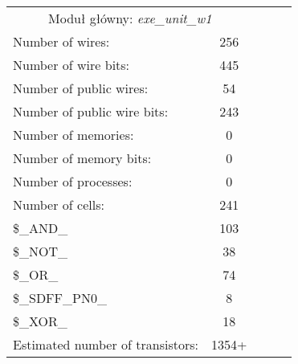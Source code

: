 \begin{table}[h!]
	\centering
	\begin{tabular}{lllll}
		\cline{1-2}
		\multicolumn{2}{|c|}{Moduł główny: \emph{exe\_unit\_w1}} &  &  &  \\ \cline{1-2}
		\multicolumn{1}{|l|}{Number of wires:} & \multicolumn{1}{c|}{256} &  &  &  \\ \cline{1-2}
		\multicolumn{1}{|l|}{Number of wire bits:} & \multicolumn{1}{c|}{445} &  &  &  \\ \cline{1-2}
		\multicolumn{1}{|l|}{Number of public wires:} & \multicolumn{1}{c|}{54} &  &  &  \\ \cline{1-2}
		\multicolumn{1}{|l|}{Number of public wire bits:} & \multicolumn{1}{c|}{243} &  &  &  \\ \cline{1-2}
		\multicolumn{1}{|l|}{Number of memories:} & \multicolumn{1}{c|}{0} &  &  &  \\ \cline{1-2}
		\multicolumn{1}{|l|}{Number of memory bits: } & \multicolumn{1}{c|}{0} &  &  &  \\ \cline{1-2}
		\multicolumn{1}{|l|}{Number of processes: } & \multicolumn{1}{c|}{0} &  &  &  \\ \cline{1-2}
		\multicolumn{1}{|l|}{Number of cells:} & \multicolumn{1}{c|}{241} &  &  &  \\ \cline{1-2}
		\multicolumn{1}{|l|}{\$\_AND\_} & \multicolumn{1}{c|}{103} &  &  &  \\ \cline{1-2}
		\multicolumn{1}{|l|}{\$\_NOT\_} & \multicolumn{1}{c|}{38} &  &  &  \\ \cline{1-2}
		\multicolumn{1}{|l|}{\$\_OR\_} & \multicolumn{1}{c|}{74} &  &  &  \\ \cline{1-2}
		\multicolumn{1}{|l|}{\$\_SDFF\_PN0\_} & \multicolumn{1}{c|}{8} &  &  &  \\ \cline{1-2}
		\multicolumn{1}{|l|}{\$\_XOR\_} & \multicolumn{1}{c|}{18} &  &  &  \\ \cline{1-2}
		\multicolumn{1}{|l|}{Estimated number of transistors:} & \multicolumn{1}{c|}{1354+} &  &  &  \\ \cline{1-2}

	\end{tabular}
\end{table}